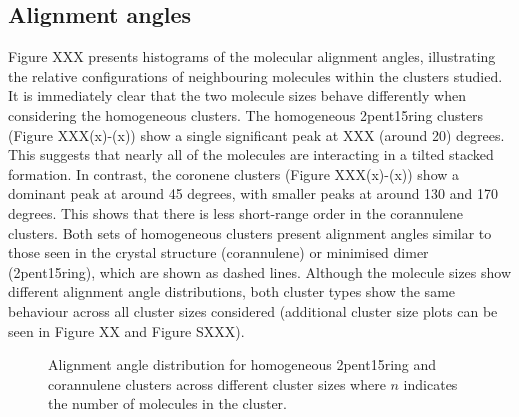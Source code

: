 





\subsection{Alignment angles}
Figure XXX presents histograms of the molecular alignment angles, illustrating the relative configurations of neighbouring molecules within the clusters studied.
It is immediately clear that the two molecule sizes behave differently when considering the homogeneous clusters. The homogeneous 2pent15ring clusters (Figure XXX(x)-(x)) show a single significant peak at XXX (around 20) degrees.  This suggests that nearly all of the molecules are interacting in a tilted stacked formation. In contrast, the coronene clusters (Figure XXX(x)-(x)) show a dominant peak at around 45 degrees, with smaller peaks at around 130 and 170 degrees. This shows that there is less short-range order in the corannulene clusters. Both sets of homogeneous clusters present alignment angles similar to those seen in the crystal structure (corannulene) or minimised dimer (2pent15ring), which are shown as dashed lines.  Although the molecule sizes show different alignment angle distributions, both cluster types show the same behaviour across all cluster sizes considered (additional cluster size plots can be seen in Figure XX and Figure SXXX).
%
\begin{figure}[!tbh]
\centering
\caption{Alignment angle distribution for homogeneous 2pent15ring and corannulene clusters across different cluster sizes where $n$ indicates the number of molecules in the cluster.}
\label{fig:alignmentangles_homo}
\end{figure}
%

